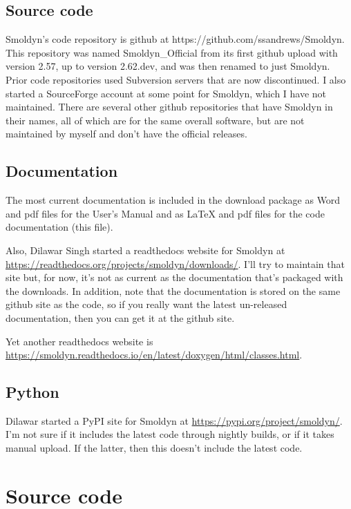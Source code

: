 \documentclass {book}
\begin{document}
\subsection{Source code}

Smoldyn's code repository is github at https://github.com/ssandrews/Smoldyn. This repository was named Smoldyn\_Official from its first github upload with version 2.57, up to version 2.62.dev, and was then renamed to just Smoldyn. Prior code repositories used Subversion servers that are now discontinued. I also started a SourceForge account at some point for Smoldyn, which I have not maintained. There are several other github repositories that have Smoldyn in their names, all of which are for the same overall software, but are not maintained by myself and don't have the official releases.

\subsection{Documentation}

The most current documentation is included in the download package as Word and pdf files for the User's Manual and as LaTeX and pdf files for the code documentation (this file).

Also, Dilawar Singh started a readthedocs website for Smoldyn at \url{https://readthedocs.org/projects/smoldyn/downloads/}. I'll try to maintain that site but, for now, it's not as current as the documentation that's packaged with the downloads. In addition, note that the documentation is stored on the same github site as the code, so if you really want the latest un-released documentation, then you can get it at the github site.

Yet another readthedocs website is \url{https://smoldyn.readthedocs.io/en/latest/doxygen/html/classes.html}.

\subsection{Python}

Dilawar started a PyPI site for Smoldyn at \url{https://pypi.org/project/smoldyn/}. I'm not sure if it includes the latest code through nightly builds, or if it takes manual upload. If the latter, then this doesn't include the latest code.


\section{Source code}
\end{document}
